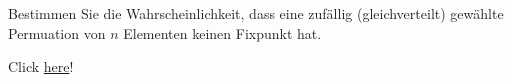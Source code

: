 
\begin{exercise}

Bestimmen Sie die Wahrscheinlichkeit, dass eine zufällig (gleichverteilt) gewählte Permuation von $n$ Elementen keinen Fixpunkt hat.

\end{exercise}


\begin{solution}

Click \href{https://de.wikipedia.org/wiki/Fixpunktfreie_Permutation}{here}!

\end{solution}

